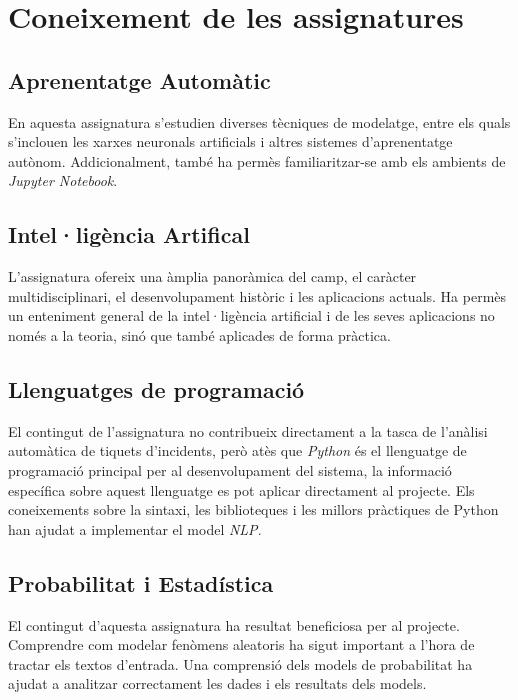 \section{Coneixement de les assignatures}
\subsection*{Aprenentatge Automàtic}
En aquesta assignatura s'estudien diverses tècniques de modelatge, entre els quals s'inclouen les xarxes neuronals artificials i altres sistemes d'aprenentatge autònom. Addicionalment, també ha permès familiaritzar-se amb els ambients de \textit{Jupyter Notebook}.

\subsection*{Intel·ligència Artifical}
L'assignatura ofereix una àmplia panoràmica del camp, el caràcter multidisciplinari, el desenvolupament històric i les aplicacions actuals. Ha permès un enteniment general de la intel·ligència artificial i de les seves aplicacions no només a la teoria, sinó que també aplicades de forma pràctica.

\subsection*{Llenguatges de programació}
El contingut de l'assignatura no contribueix directament a la tasca de l'anàlisi automàtica de tiquets d'incidents, però atès que \textit{Python} és el llenguatge de programació principal per al desenvolupament del sistema, la informació específica sobre aquest llenguatge es pot aplicar directament al projecte. Els coneixements sobre la sintaxi, les biblioteques i les millors pràctiques de Python han ajudat a implementar el model \textit{NLP}.

\subsection*{Probabilitat i Estadística}
El contingut d'aquesta assignatura ha resultat beneficiosa per al projecte. Comprendre com modelar fenòmens aleatoris ha sigut important a l'hora de tractar els textos d'entrada. Una comprensió dels models de probabilitat ha ajudat a analitzar correctament les dades i els resultats dels models.
